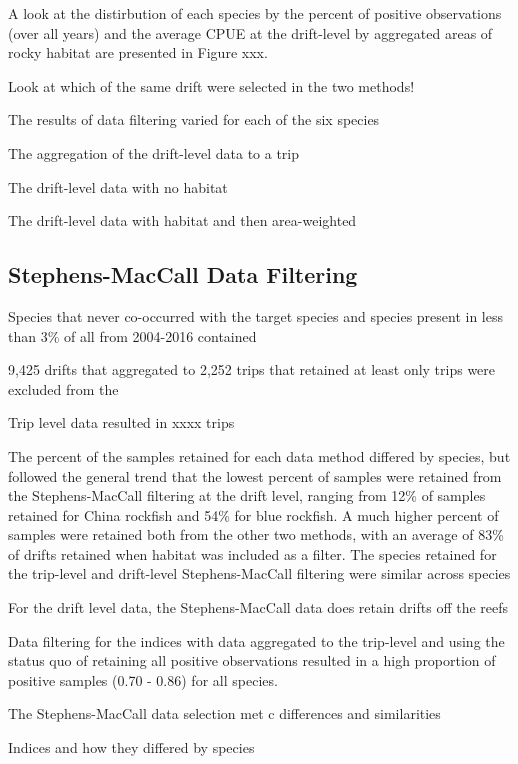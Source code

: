 \documentclass[
  authoryear,
  preprint,
  3p]{elsarticle}
\begin{document}
A look at the distirbution of each species by the percent of positive
observations (over all years) and the average CPUE at the drift-level by
aggregated areas of rocky habitat are presented in Figure xxx.

Look at which of the same drift were selected in the two methods!

The results of data filtering varied for each of the six species

The aggregation of the drift-level data to a trip

The drift-level data with no habitat

The drift-level data with habitat and then area-weighted

\hypertarget{stephens-maccall-data-filtering-1}{%
\subsection{Stephens-MacCall Data
Filtering}\label{stephens-maccall-data-filtering-1}}

Species that never co-occurred with the target species and species
present in less than 3\% of all from 2004-2016 contained

9,425 drifts that aggregated to 2,252 trips that retained at least only
trips were excluded from the

Trip level data resulted in xxxx trips

The percent of the samples retained for each data method differed by
species, but followed the general trend that the lowest percent of
samples were retained from the Stephens-MacCall filtering at the drift
level, ranging from 12\% of samples retained for China rockfish and 54\%
for blue rockfish. A much higher percent of samples were retained both
from the other two methods, with an average of 83\% of drifts retained
when habitat was included as a filter. The species retained for the
trip-level and drift-level Stephens-MacCall filtering were similar
across species

For the drift level data, the Stephens-MacCall data does retain drifts
off the reefs

Data filtering for the indices with data aggregated to the trip-level
and using the status quo of retaining all positive observations resulted
in a high proportion of positive samples (0.70 - 0.86) for all species.

The Stephens-MacCall data selection met c differences and similarities

Indices and how they differed by species
\end{document}
